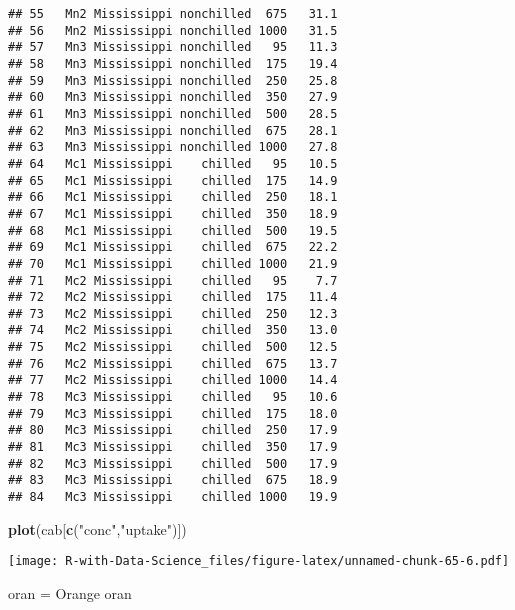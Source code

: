 \documentclass[
]{article}
\newenvironment{Shaded}{\begin{snugshade}}{\end{snugshade}}
\newcommand{\FunctionTok}[1]{\textcolor[rgb]{0.13,0.29,0.53}{\textbf{#1}}}
\newcommand{\NormalTok}[1]{#1}
\newcommand{\OtherTok}[1]{\textcolor[rgb]{0.56,0.35,0.01}{#1}}
\newcommand{\StringTok}[1]{\textcolor[rgb]{0.31,0.60,0.02}{#1}}
\begin{document}
\begin{verbatim}
## 55   Mn2 Mississippi nonchilled  675   31.1
## 56   Mn2 Mississippi nonchilled 1000   31.5
## 57   Mn3 Mississippi nonchilled   95   11.3
## 58   Mn3 Mississippi nonchilled  175   19.4
## 59   Mn3 Mississippi nonchilled  250   25.8
## 60   Mn3 Mississippi nonchilled  350   27.9
## 61   Mn3 Mississippi nonchilled  500   28.5
## 62   Mn3 Mississippi nonchilled  675   28.1
## 63   Mn3 Mississippi nonchilled 1000   27.8
## 64   Mc1 Mississippi    chilled   95   10.5
## 65   Mc1 Mississippi    chilled  175   14.9
## 66   Mc1 Mississippi    chilled  250   18.1
## 67   Mc1 Mississippi    chilled  350   18.9
## 68   Mc1 Mississippi    chilled  500   19.5
## 69   Mc1 Mississippi    chilled  675   22.2
## 70   Mc1 Mississippi    chilled 1000   21.9
## 71   Mc2 Mississippi    chilled   95    7.7
## 72   Mc2 Mississippi    chilled  175   11.4
## 73   Mc2 Mississippi    chilled  250   12.3
## 74   Mc2 Mississippi    chilled  350   13.0
## 75   Mc2 Mississippi    chilled  500   12.5
## 76   Mc2 Mississippi    chilled  675   13.7
## 77   Mc2 Mississippi    chilled 1000   14.4
## 78   Mc3 Mississippi    chilled   95   10.6
## 79   Mc3 Mississippi    chilled  175   18.0
## 80   Mc3 Mississippi    chilled  250   17.9
## 81   Mc3 Mississippi    chilled  350   17.9
## 82   Mc3 Mississippi    chilled  500   17.9
## 83   Mc3 Mississippi    chilled  675   18.9
## 84   Mc3 Mississippi    chilled 1000   19.9
\end{verbatim}

\begin{Shaded}
\begin{Highlighting}[]
\FunctionTok{plot}\NormalTok{(cab[}\FunctionTok{c}\NormalTok{(}\StringTok{"conc"}\NormalTok{,}\StringTok{"uptake"}\NormalTok{)])}
\end{Highlighting}
\end{Shaded}

\texttt{[image: R-with-Data-Science\_files/figure-latex/unnamed-chunk-65-6.pdf]}

\begin{Shaded}
\begin{Highlighting}[]
\NormalTok{oran }\OtherTok{=}\NormalTok{ Orange}
\NormalTok{oran}
\end{Highlighting}
\end{Shaded}
\end{document}
